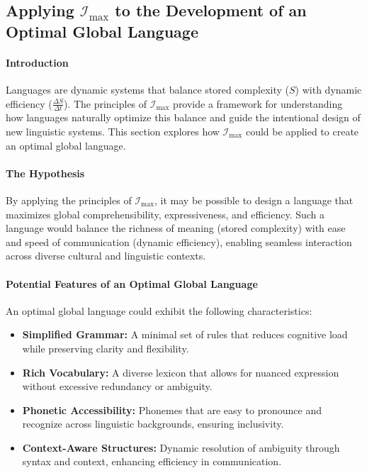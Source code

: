 \documentclass[12pt]{article}
\begin{document}
\subsection{Applying \(\mathcal{I}_{\text{max}}\) to the Development of an Optimal Global Language}

\paragraph{Introduction}
Languages are dynamic systems that balance stored complexity (\(S\)) with dynamic efficiency (\(\frac{\Delta S}{\Delta t}\)). The principles of \(\mathcal{I}_{\text{max}}\) provide a framework for understanding how languages naturally optimize this balance and guide the intentional design of new linguistic systems. This section explores how \(\mathcal{I}_{\text{max}}\) could be applied to create an optimal global language.

\paragraph{The Hypothesis}
By applying the principles of \(\mathcal{I}_{\text{max}}\), it may be possible to design a language that maximizes global comprehensibility, expressiveness, and efficiency. Such a language would balance the richness of meaning (stored complexity) with ease and speed of communication (dynamic efficiency), enabling seamless interaction across diverse cultural and linguistic contexts.

\paragraph{Potential Features of an Optimal Global Language}
An optimal global language could exhibit the following characteristics:
\begin{itemize}
    \item \textbf{Simplified Grammar:} A minimal set of rules that reduces cognitive load while preserving clarity and flexibility.
    \item \textbf{Rich Vocabulary:} A diverse lexicon that allows for nuanced expression without excessive redundancy or ambiguity.
    \item \textbf{Phonetic Accessibility:} Phonemes that are easy to pronounce and recognize across linguistic backgrounds, ensuring inclusivity.
    \item \textbf{Context-Aware Structures:} Dynamic resolution of ambiguity through syntax and context, enhancing efficiency in communication.
\end{itemize}
\end{document}
